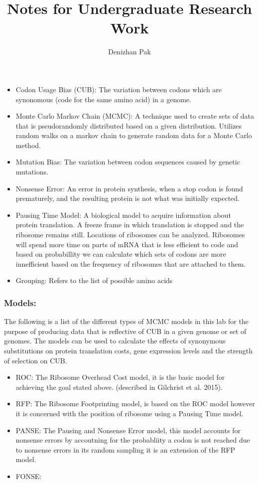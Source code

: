 \documentclass[12pt,hyperref]{labbook}
\title{Notes for Undergraduate Research Work}
\author{Denizhan Pak}
\begin{document}
\maketitle
\newpage
\tableofcontents
\newpage




\begin{itemize}
	\item Codon Usage Bias (CUB): The variation between codons which are synonomous (code for the same amino acid) in a genome.
	\item Monte Carlo Markov Chain (MCMC): A technique used to create sets of data that is pseudorandomly distributed based on a given distribution. Utilizes random walks on a markov chain to generate random data for a Monte Carlo method.
	\item Mutation Bias: The variation between codon sequences caused by genetic mutations.
	\item Nonsense Error: An error in protein synthesis, when a stop codon is found prematurely, and the resulting protein is not what was initially expected.
	\item Pausing Time Model: A biological model to acquire information about protein translation. A freeze frame in which translation is stopped and the ribosome remains still. Locations of ribosomes can be analyzed. Ribosomes will spend more time on parts of mRNA that is less efficient to code and based on probabillity we can calculate which sets of codons are more innefficient based on the frequency of ribosomes that are attached to them.
    \item Grouping: Refers to the list of possible amino acids
\end{itemize}


\subsubsection{Models:}
The following is a list of the different types of MCMC models in this lab for the purpose of producing data that is reflective of CUB in a given genome or set of genomes. The models can be used to calculate the effects of synonymous substitutions on protein translation costs, gene expression levels and the strength of selection on CUB.
\begin{itemize}
	\item ROC: The Ribosome Overhead Cost model, it is the basic model for achieving the goal stated above. (described in Gilchrist et al. 2015).
	\item RFP: The Ribosome Footprinting model, is based on the ROC model however it is concerned with the position of ribosome using a Pausing Time model.
	\item PANSE: The Pausing and Nonsense Error model, this model accounts for nonsense errors by accoutning for the probabliity a codon is not reached due to nonsense errors in its random sampling it is an extension of the RFP model.
	\item FONSE:
\end{itemize}
\end{document}

